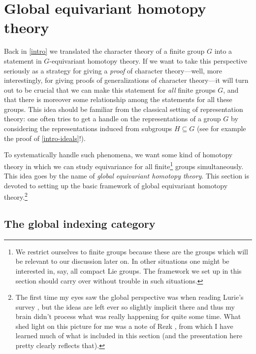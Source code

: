 \section{Global equivariant homotopy theory}
\label{global}

Back in \cref{intro} we translated the character theory of a finite
group $G$ into a statement in $G$-equivariant homotopy theory. If we
want to take this perspective seriously as a strategy for giving a
\emph{proof} of character theory---well, more interestingly, for
giving proofs of generalizations of character theory---it will turn
out to be crucial that we can make this statement for \emph{all}
finite groups $G$, and that there is moreover some relationship among
the statements for all these groups. This idea should be familiar from
the classical setting of representation theory: one often tries to get
a handle on the representations of a group $G$ by considering the
representations induced from subgroups $H \subseteq G$ (see for
example the proof of \cref{intro-ideals}!).

To systematically handle such phenomena, we want some kind of homotopy
theory in which we can study equivariance for all finite\footnote{We
  restrict ourselves to finite groups because these are the groups
  which will be relevant to our discussion later on. In other
  situations one might be interested in, say, all compact Lie
  groups. The framework we set up in this section should carry over
  without trouble in such situations.}  groups simultaneously. This
idea goes by the name of \emph{global equivariant homotopy
  theory}. This section is devoted to setting up the basic framework
of global equivariant homotopy theory.\footnote{The first time my eyes
  saw the global perspective was when reading Lurie's survey
  \cite{lurie-elliptic-survey}, but the ideas are left ever so
  slightly implicit there and thus my brain didn't process what was
  really happening for quite some time. What shed light on this
  picture for me was a note of Rezk \cite{rezk-global-cohesion}, from
  which I have learned much of what is included in this section (and
  the presentation here pretty clearly reflects that).}


\subsection{The global indexing category}
\label{global-indexcat}

